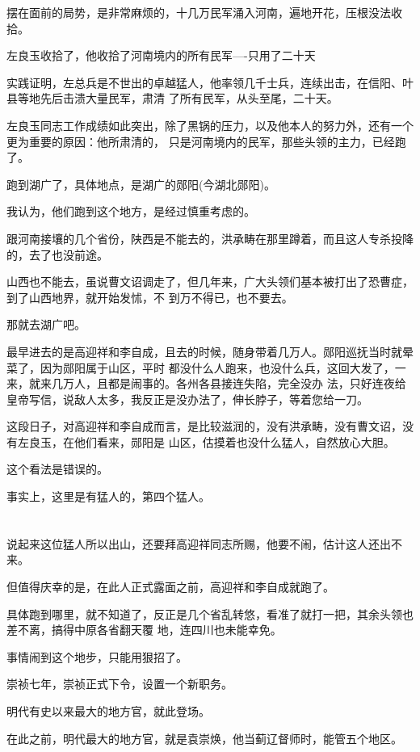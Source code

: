 \documentclass[11pt,a4paper,onecolumn]{article}
\begin{document}
摆在面前的局势，是非常麻烦的，十几万民军涌入河南，遍地开花，压根没法收拾。

左良玉收拾了，他收拾了河南境内的所有民军----只用了二十天

实践证明，左总兵是不世出的卓越猛人，他率领几千士兵，连续出击，在信阳、叶县等地先后击溃大量民军，肃清
了所有民军，从头至尾，二十天。

左良玉同志工作成绩如此突出，除了黑锅的压力，以及他本人的努力外，还有一个更为重要的原因：他所肃清的，
只是河南境内的民军，那些头领的主力，已经跑了。

跑到湖广了，具体地点，是湖广的郧阳(今湖北郧阳)。

我认为，他们跑到这个地方，是经过慎重考虑的。

跟河南接壤的几个省份，陕西是不能去的，洪承畴在那里蹲着，而且这人专杀投降的，去了也没前途。

山西也不能去，虽说曹文诏调走了，但几年来，广大头领们基本被打出了恐曹症，到了山西地界，就开始发怵，不
到万不得已，也不要去。

那就去湖广吧。

最早进去的是高迎祥和李自成，且去的时候，随身带着几万人。郧阳巡抚当时就晕菜了，因为郧阳属于山区，平时
都没什么人跑来，也没什么兵，这回大发了，一来，就来几万人，且都是闹事的。各州各县接连失陷，完全没办
法，只好连夜给皇帝写信，说敌人太多，我反正是没办法了，伸长脖子，等着您给一刀。

这段日子，对高迎祥和李自成而言，是比较滋润的，没有洪承畴，没有曹文诏，没有左良玉，在他们看来，郧阳是
山区，估摸着也没什么猛人，自然放心大胆。

这个看法是错误的。

事实上，这里是有猛人的，第四个猛人。

\section[\thesection]{}

说起来这位猛人所以出山，还要拜高迎祥同志所赐，他要不闹，估计这人还出不来。

但值得庆幸的是，在此人正式露面之前，高迎祥和李自成就跑了。

具体跑到哪里，就不知道了，反正是几个省乱转悠，看准了就打一把，其余头领也差不离，搞得中原各省翻天覆
地，连四川也未能幸免。

事情闹到这个地步，只能用狠招了。

崇祯七年，崇祯正式下令，设置一个新职务。

明代有史以来最大的地方官，就此登场。

在此之前，明代最大的地方官，就是袁崇焕，他当蓟辽督师时，能管五个地区。
\end{document}
